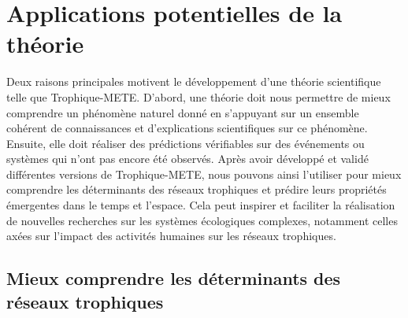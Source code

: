 
\section{Applications potentielles de la théorie} 

Deux raisons principales motivent le développement d'une théorie scientifique
telle que Trophique-METE. D'abord, une théorie doit nous permettre de mieux
comprendre un phénomène naturel donné en s'appuyant sur un ensemble cohérent de
connaissances et d'explications scientifiques sur ce phénomène. Ensuite, elle
doit réaliser des prédictions vérifiables sur des événements ou systèmes qui
n'ont pas encore été observés. Après avoir développé et validé différentes
versions de Trophique-METE, nous pouvons ainsi l'utiliser pour mieux comprendre
les déterminants des réseaux trophiques et prédire leurs propriétés émergentes
dans le temps et l'espace. Cela peut inspirer et faciliter la réalisation de
nouvelles recherches sur les systèmes écologiques complexes, notamment celles
axées sur l'impact des activités humaines sur les réseaux trophiques.

\subsection{Mieux comprendre les déterminants des réseaux trophiques} 

